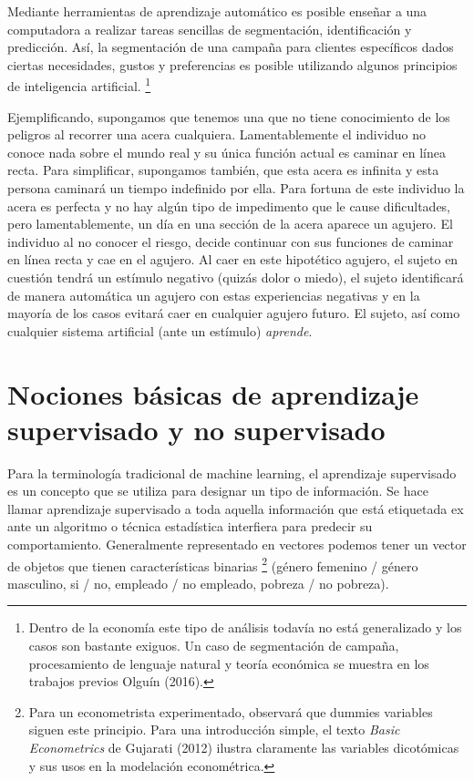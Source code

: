 \documentclass[letterpaper,12pt, spanish, oneside]{book} %
\let\oldfootnote\footnote
\renewcommand{\footnote}[1]{%
  \begingroup%
  \linespread{1.2}%
  \oldfootnote{#1}%
  \endgroup%
}
\begin{document}
Mediante herramientas de aprendizaje automático es posible enseñar a una computadora a realizar tareas sencillas de segmentación, identificación y predicción. Así, la segmentación de una campaña para clientes específicos dados ciertas necesidades, gustos y preferencias es posible utilizando algunos principios de inteligencia artificial.\footnote{Dentro de la economía este tipo de análisis todavía no está generalizado y los casos son bastante exiguos. Un caso de segmentación de campaña, procesamiento de lenguaje natural y teoría económica se muestra en los trabajos previos Olguín (2016).}

Ejemplificando, supongamos que tenemos una que no tiene conocimiento de los peligros al recorrer una acera cualquiera. Lamentablemente el individuo no conoce nada sobre el mundo real y su única función actual es caminar en línea recta. Para simplificar, supongamos también, que esta acera es infinita y esta persona caminará un tiempo indefinido por ella. Para fortuna de este individuo la acera es perfecta y no hay algún tipo de impedimento que le cause dificultades, pero lamentablemente, un día en una sección de la acera aparece un agujero. El individuo al no conocer el riesgo, decide continuar con sus funciones de caminar en línea recta y cae en el agujero. Al caer en este hipotético agujero, el sujeto en cuestión tendrá un estímulo negativo (quizás dolor o miedo), el sujeto identificará de manera automática un agujero con estas experiencias negativas y en la mayoría de los casos evitará caer en cualquier agujero futuro. El sujeto, así como cualquier sistema artificial (ante un estímulo) \textit{aprende}.

\section{Nociones básicas de aprendizaje supervisado y no supervisado}

Para la terminología tradicional de machine learning, el aprendizaje supervisado es un concepto que se utiliza para designar un tipo de información. Se hace llamar aprendizaje supervisado a toda aquella información que está etiquetada ex ante un algoritmo o técnica estadística interfiera para predecir su comportamiento. Generalmente representado en vectores podemos tener un vector de objetos que tienen características binarias\footnote{Para un econometrista experimentado, observará que dummies variables siguen este principio. Para una introducción simple, el texto \textit{Basic Econometrics} de Gujarati (2012) ilustra claramente las variables dicotómicas y sus usos en la modelación econométrica.} (género femenino / género masculino, si / no, empleado / no empleado, pobreza / no pobreza). 
\end{document}
